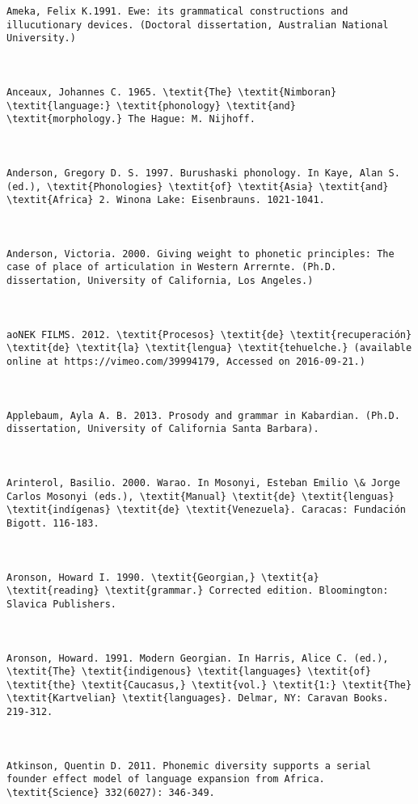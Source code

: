 \begin{verbatim}
Ameka, Felix K.1991. Ewe: its grammatical constructions and illucutionary devices. (Doctoral dissertation, Australian National University.)



Anceaux, Johannes C. 1965. \textit{The} \textit{Nimboran} \textit{language:} \textit{phonology} \textit{and} \textit{morphology.} The Hague: M. Nijhoff.



Anderson, Gregory D. S. 1997. Burushaski phonology. In Kaye, Alan S. (ed.), \textit{Phonologies} \textit{of} \textit{Asia} \textit{and} \textit{Africa} 2. Winona Lake: Eisenbrauns. 1021-1041.



Anderson, Victoria. 2000. Giving weight to phonetic principles: The case of place of articulation in Western Arrernte. (Ph.D. dissertation, University of California, Los Angeles.)



aoNEK FILMS. 2012. \textit{Procesos} \textit{de} \textit{recuperación} \textit{de} \textit{la} \textit{lengua} \textit{tehuelche.} (available online at https://vimeo.com/39994179, Accessed on 2016-09-21.)



Applebaum, Ayla A. B. 2013. Prosody and grammar in Kabardian. (Ph.D. dissertation, University of California Santa Barbara).



Arinterol, Basilio. 2000. Warao. In Mosonyi, Esteban Emilio \& Jorge Carlos Mosonyi (eds.), \textit{Manual} \textit{de} \textit{lenguas} \textit{indígenas} \textit{de} \textit{Venezuela}. Caracas: Fundación Bigott. 116-183.



Aronson, Howard I. 1990. \textit{Georgian,} \textit{a} \textit{reading} \textit{grammar.} Corrected edition. Bloomington: Slavica Publishers.



Aronson, Howard. 1991. Modern Georgian. In Harris, Alice C. (ed.), \textit{The} \textit{indigenous} \textit{languages} \textit{of} \textit{the} \textit{Caucasus,} \textit{vol.} \textit{1:} \textit{The} \textit{Kartvelian} \textit{languages}. Delmar, NY: Caravan Books. 219-312.



Atkinson, Quentin D. 2011. Phonemic diversity supports a serial founder effect model of language expansion from Africa. \textit{Science} 332(6027): 346-349.




\end{verbatim}
